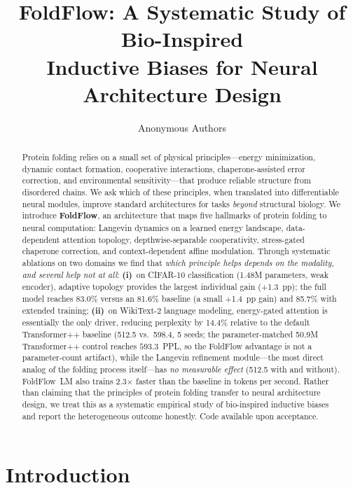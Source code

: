 \documentclass[10pt]{article}
\title{FoldFlow: A Systematic Study of Bio-Inspired\\Inductive Biases for Neural Architecture Design}
\author{Anonymous Authors}
\begin{document}
\maketitle

\begin{abstract}
Protein folding relies on a small set of physical principles---energy
minimization, dynamic contact formation, cooperative interactions,
chaperone-assisted error correction, and environmental
sensitivity---that produce reliable structure from disordered chains.
We ask which of these principles, when translated into differentiable
neural modules, improve standard architectures for tasks \emph{beyond}
structural biology.  We introduce \textbf{FoldFlow}, an architecture
that maps five hallmarks of protein folding to neural computation:
Langevin dynamics on a learned energy landscape, data-dependent
attention topology, depthwise-separable cooperativity, stress-gated
chaperone correction, and context-dependent affine modulation.
Through systematic ablations on two domains we find that
\emph{which principle helps depends on the modality, and several
help not at all}:
\textbf{(i)}~on CIFAR-10 classification (1.48M parameters, weak
encoder), adaptive topology provides the largest individual gain
(+1.3~pp); the full model reaches 83.0\% versus an 81.6\% baseline
(a small +1.4~pp gain) and 85.7\% with extended training;
\textbf{(ii)}~on WikiText-2 language modeling, energy-gated attention
is essentially the only driver, reducing perplexity by 14.4\%
relative to the default Transformer++ baseline (512.5 vs.\ 598.4,
5 seeds; the parameter-matched 50.9M Transformer++ control reaches
$593.3$~PPL, so the FoldFlow advantage is not a parameter-count
artifact), while the Langevin refinement module---the most direct
analog of the folding process itself---has \emph{no measurable
effect} (512.5 with and without).  FoldFlow~LM also trains
2.3$\times$ faster than the baseline in tokens per second.  Rather
than claiming that the principles of protein folding transfer to
neural architecture design, we treat this as a systematic empirical
study of bio-inspired inductive biases and report the heterogeneous
outcome honestly.
Code available upon acceptance.
\end{abstract}

\section{Introduction}
\label{sec:intro}
\end{document}
